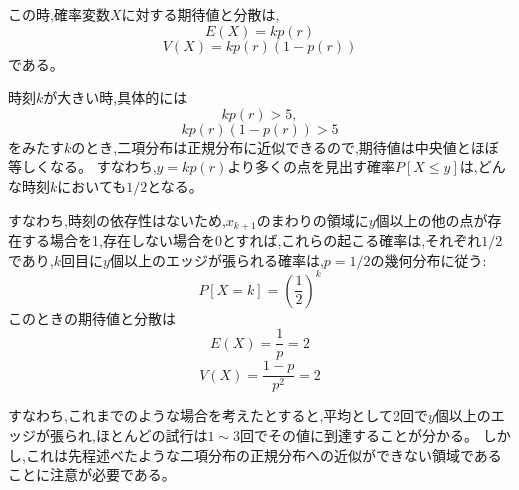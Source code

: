 この時,確率変数$X$に対する期待値と分散は,
\[E(X) = kp(r)\]
\[V(X) = kp(r)(1-p(r))\]
である。

時刻$k$が大きい時,具体的には
\[kp(r) > 5,\]
\[kp(r)(1-p(r)) > 5\]
をみたす$k$のとき,二項分布は正規分布に近似できるので,期待値は中央値とほぼ等しくなる。
すなわち,$y=kp(r)$より多くの点を見出す確率$P[X\le y]$は,どんな時刻$k$においても$1/2$となる。

すなわち,時刻の依存性はないため,$x_{k+1}$のまわりの領域に$y$個以上の他の点が存在する場合を1,存在しない場合を0とすれば,これらの起こる確率は,それぞれ$1/2$であり,$k$回目に$y$個以上のエッジが張られる確率は,$p=1/2$の幾何分布に従う:
\[P[X=k] = \left( \frac{1}{2} \right)^{k}\]
このときの期待値と分散は
\[E(X) = \frac{1}{p} = 2\]
\[V(X) = \frac{1-p}{p^{2}} = 2\]

すなわち,これまでのような場合を考えたとすると,平均として2回で$y$個以上のエッジが張られ,ほとんどの試行は$1\sim3$回でその値に到達することが分かる。
しかし,これは先程述べたような二項分布の正規分布への近似ができない領域であることに注意が必要である。
